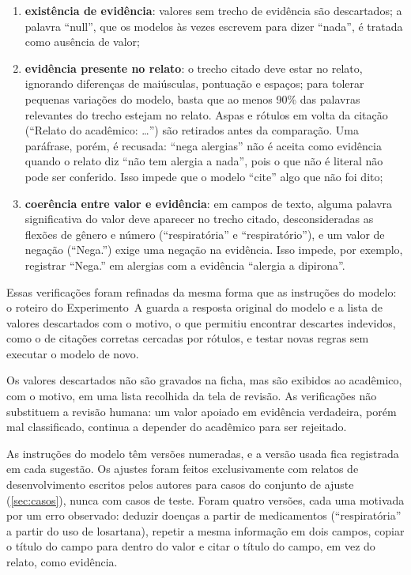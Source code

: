 \begin{enumerate}
	\item \textbf{existência de evidência}: valores sem trecho de evidência são descartados; a palavra ``null'', que os modelos às vezes escrevem para dizer ``nada'', é tratada como ausência de valor;
	\item \textbf{evidência presente no relato}: o trecho citado deve estar no relato, ignorando diferenças de maiúsculas, pontuação e espaços; para tolerar pequenas variações do modelo, basta que ao menos 90\% das palavras relevantes do trecho estejam no relato. Aspas e rótulos em volta da citação (``Relato do acadêmico: \ldots'') são retirados antes da comparação. Uma paráfrase, porém, é recusada: ``nega alergias'' não é aceita como evidência quando o relato diz ``não tem alergia a nada'', pois o que não é literal não pode ser conferido. Isso impede que o modelo ``cite'' algo que não foi dito;
	\item \textbf{coerência entre valor e evidência}: em campos de texto, alguma palavra significativa do valor deve aparecer no trecho citado, desconsideradas as flexões de gênero e número (``respiratória'' e ``respiratório''), e um valor de negação (``Nega.'') exige uma negação na evidência. Isso impede, por exemplo, registrar ``Nega.'' em alergias com a evidência ``alergia a dipirona''.
\end{enumerate}

Essas verificações foram refinadas da mesma forma que as instruções do modelo: o roteiro do Experimento~A guarda a resposta original do modelo e a lista de valores descartados com o motivo, o que permitiu encontrar descartes indevidos, como o de citações corretas cercadas por rótulos, e testar novas regras sem executar o modelo de novo.

Os valores descartados não são gravados na ficha, mas são exibidos ao acadêmico, com o motivo, em uma lista recolhida da tela de revisão. As verificações não substituem a revisão humana: um valor apoiado em evidência verdadeira, porém mal classificado, continua a depender do acadêmico para ser rejeitado.

As instruções do modelo têm versões numeradas, e a versão usada fica registrada em cada sugestão. Os ajustes foram feitos exclusivamente com relatos de desenvolvimento escritos pelos autores para casos do conjunto de ajuste (\autoref{sec:casos}), nunca com casos de teste. Foram quatro versões, cada uma motivada por um erro observado: deduzir doenças a partir de medicamentos (``respiratória'' a partir do uso de losartana), repetir a mesma informação em dois campos, copiar o título do campo para dentro do valor e citar o título do campo, em vez do relato, como evidência.

